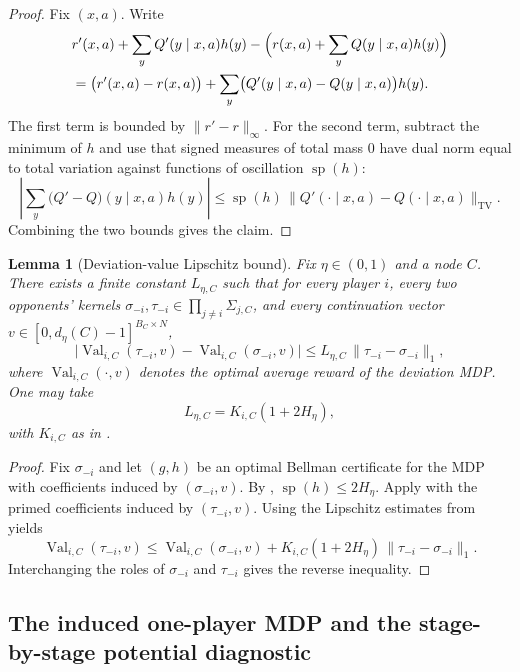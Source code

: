 \documentclass[12pt]{article}
\newtheorem{lemma}[theorem]{Lemma}
\theoremstyle{definition}
\newcommand{\1}{\mathbf{1}}
\DeclareMathOperator{\spn}{sp}
\begin{document}
\begin{proof}
Fix $(x,a)$. Write
\begin{align*}
&r'(x,a)+\sum_y Q'(y\mid x,a)h(y)
-
\Bigl(r(x,a)+\sum_y Q(y\mid x,a)h(y)\Bigr)
\\
&= \bigl(r'(x,a)-r(x,a)\bigr)
+
\sum_y\bigl(Q'(y\mid x,a)-Q(y\mid x,a)\bigr)h(y).
\end{align*}
The first term is bounded by $\|r'-r\|_\infty$. For the second term, subtract the
minimum of $h$ and use that signed measures of total mass $0$ have dual norm equal
to total variation against functions of oscillation $\spn(h)$:
\[
\left|\sum_y\bigl(Q'-Q\bigr)(y\mid x,a)h(y)\right|
\le
\spn(h)\,\|Q'(\cdot\mid x,a)-Q(\cdot\mid x,a)\|_{\mathrm{TV}}.
\]
Combining the two bounds gives the claim.
\end{proof}

\begin{lemma}[Deviation-value Lipschitz bound]
\label{lem:deviation-lipschitz}
Fix $\eta\in(0,1)$ and a node $C$. There exists a finite constant $L_{\eta,C}$
such that for every player $i$, every two opponents' kernels
$\sigma_{-i},\tau_{-i}\in\prod_{j\ne i}\Sigma_{j,C}$, and every continuation vector
$v\in[0,d_\eta(C)-1]^{B_C\times N}$,
\[
\bigl|\operatorname{Val}_{i,C}(\tau_{-i},v)-\operatorname{Val}_{i,C}(\sigma_{-i},v)\bigr|
\le L_{\eta,C}\,\|\tau_{-i}-\sigma_{-i}\|_1,
\]
where $\operatorname{Val}_{i,C}(\cdot,v)$ denotes the optimal average reward of the
deviation MDP. One may take
\[
L_{\eta,C}=K_{i,C}(1+2H_\eta),
\]
with $K_{i,C}$ as in .
\end{lemma}

\begin{proof}
Fix $\sigma_{-i}$ and let $(g,h)$ be an optimal Bellman certificate for the MDP with
coefficients induced by $(\sigma_{-i},v)$. By ,
$\spn(h)\le 2H_\eta$. Apply  with the primed
coefficients induced by $(\tau_{-i},v)$. Using the Lipschitz estimates from
 yields
\[
\operatorname{Val}_{i,C}(\tau_{-i},v)
\le
\operatorname{Val}_{i,C}(\sigma_{-i},v)
+
K_{i,C}(1+2H_\eta)\,\|\tau_{-i}-\sigma_{-i}\|_1.
\]
Interchanging the roles of $\sigma_{-i}$ and $\tau_{-i}$ gives the reverse
inequality.
\end{proof}




\subsection{The induced one-player MDP and the stage-by-stage potential diagnostic}
\end{document}
